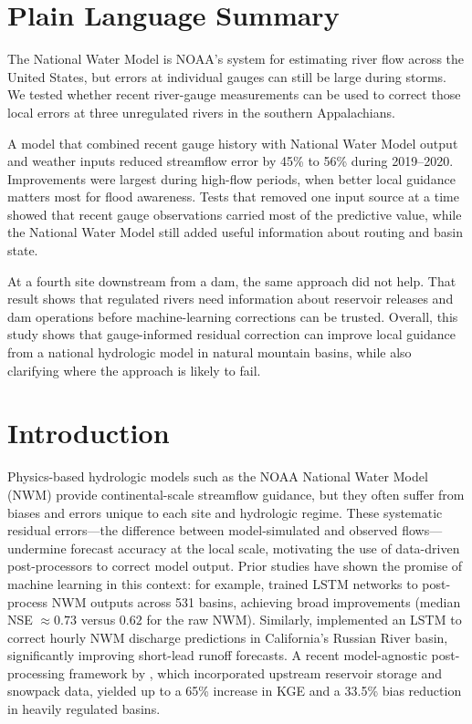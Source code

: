 \documentclass[draft]{agujournal2019}
\begin{document}
\section*{Plain Language Summary}
The National Water Model is NOAA's system for estimating river flow across the United States, but errors at individual gauges can still be large during storms. We tested whether recent river-gauge measurements can be used to correct those local errors at three unregulated rivers in the southern Appalachians.

A model that combined recent gauge history with National Water Model output and weather inputs reduced streamflow error by 45\% to 56\% during 2019--2020. Improvements were largest during high-flow periods, when better local guidance matters most for flood awareness. Tests that removed one input source at a time showed that recent gauge observations carried most of the predictive value, while the National Water Model still added useful information about routing and basin state.

At a fourth site downstream from a dam, the same approach did not help. That result shows that regulated rivers need information about reservoir releases and dam operations before machine-learning corrections can be trusted. Overall, this study shows that gauge-informed residual correction can improve local guidance from a national hydrologic model in natural mountain basins, while also clarifying where the approach is likely to fail.


\section{Introduction}

Physics-based hydrologic models such as the NOAA National Water Model (NWM) provide continental-scale streamflow guidance, but they often suffer from biases and errors unique to each site and hydrologic regime. These systematic residual errors---the difference between model-simulated and observed flows---undermine forecast accuracy at the local scale, motivating the use of data-driven post-processors to correct model output. Prior studies have shown the promise of machine learning in this context: for example,  trained LSTM networks to post-process NWM outputs across 531 basins, achieving broad improvements (median NSE $\approx 0.73$ versus $0.62$ for the raw NWM). Similarly,  implemented an LSTM to correct hourly NWM discharge predictions in California's Russian River basin, significantly improving short-lead runoff forecasts. A recent model-agnostic post-processing framework by , which incorporated upstream reservoir storage and snowpack data, yielded up to a 65\% increase in KGE and a 33.5\% bias reduction in heavily regulated basins.
\end{document}
